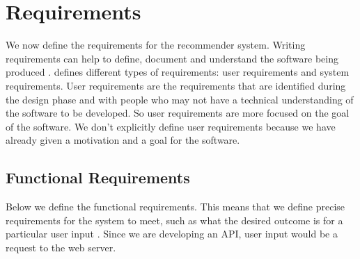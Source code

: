 \chapter{Requirements}

\label{chap:requiremnts}

We now define the requirements for the recommender system. Writing requirements can help to define, document and understand the software being produced \cite{sommerville2011software}. \cite{sommerville2011software} defines different types of requirements: user requirements and system requirements. User requirements are the requirements that are identified during the design phase and with people who may not have a technical understanding of the software to be developed. So user requirements are more focused on the goal of the software. We don't explicitly define user requirements because we have already given a motivation and a goal for the software.

\section{Functional Requirements}

\label{sec:func_requiremnts}

Below we define the functional requirements. This means that we define precise requirements for the system to meet, such as what the desired outcome is for a particular user input \cite{sommerville2011software}. Since we are developing an API, user input would be a request to the web server.

